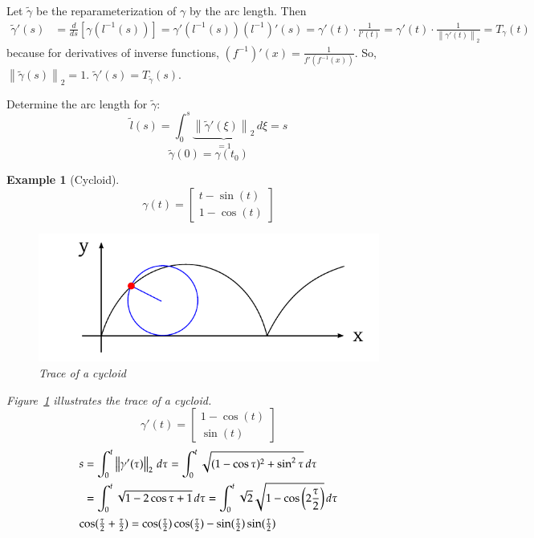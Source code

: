 \documentclass{article}
\newtheorem{example}{Example}  \numberwithin{example}{section}
\newcommand{\norm}[1]{\left\|#1\right\|}
\begin{document}
Let $\tilde\gamma$ be the reparameterization of $\gamma$ by the arc length. Then
\begin{align*}
  \tilde\gamma'(s) &= \frac d{ds} [\gamma(l^{-1}(s))]
    = \gamma' (l^{-1}(s)) (l^{-1})'(s)
    = \gamma' (t) \cdot \frac{1}{l'(t)}
    = \gamma' (t) \cdot \frac{1}{\norm{\gamma'(t)}_2} = T_{\gamma}(t)
\end{align*}
because for derivatives of inverse functions, $(f^{-1})'(x) = \frac{1}{f'(f^{-1}(x))}$.
So, $\norm{\tilde\gamma(s)}_2 = 1$. $\tilde\gamma'(s) = T_{\tilde\gamma}(s)$.

Determine the arc length for $\tilde\gamma$:
\[ \tilde l(s) = \int_0^s \underbrace{\norm{\tilde\gamma'(\xi)}_2}_{= 1} \, d\xi = s \]
\[ \tilde\gamma(0) = \gamma(t_0) \]

\begin{example}[Cycloid]
  \[ \gamma(t) = \begin{bmatrix} t - \sin(t) \\ 1 - \cos(t) \end{bmatrix} \]
  \begin{figure}
    \begin{center}
      \includegraphics{img/48_cycloid.pdf}
      \caption{Trace of a cycloid}
      \label{img:cycloid}
    \end{center}
  \end{figure}
  Figure~\ref{img:cycloid} illustrates the trace of a cycloid.
  \[ \gamma'(t) = \begin{bmatrix} 1 - \cos(t) \\ \sin(t) \end{bmatrix} \]
  \begin{align*}
    s &= \int_0^t \norm{\gamma'(\tau)}_2 \, d\tau = \int_0^t \sqrt{(1 - \cos\tau)^2 + \sin^2 \tau} \, d\tau \\
      &= \int_0^t \sqrt{1 - 2 \cos \tau + 1} \, d\tau = \int_0^t \sqrt2 \sqrt{1 - \cos\left(2 \frac{\tau}{2}\right)} \, d\tau \\
    \intertext{$\cos(\frac\tau2 + \frac\tau2) = \cos(\frac\tau2)\cos(\frac\tau2) - \sin(\frac\tau2)\sin(\frac\tau2)$}

\end{align*}
\end{example}
\end{document}
